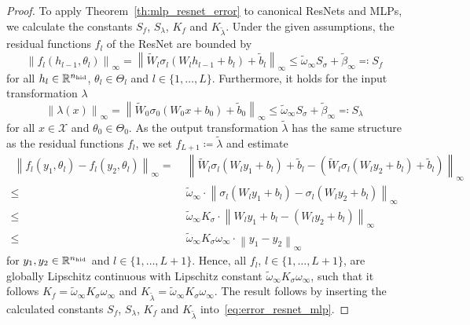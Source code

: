 \documentclass[10pt]{article}
\theoremstyle{definition}
\numberwithin{equation}{section}
\newcommand\norm[1]{\left\lVert#1\right\rVert}
\newcommand{\R}{\mathbb{R}}
\newcommand*{\nhid}{n_\textup{hid}}
\begin{document}
    \begin{proof}
    To apply Theorem~\ref{th:mlp_resnet_error} to canonical ResNets and MLPs, we calculate the constants $S_f$,  $S_\lambda$, $K_f$ and $K_{\tilde{\lambda}}$. Under the given assumptions, the residual functions $f_l$ of the ResNet are bounded by 
	\begin{equation*} \label{eq:resnet_mlp_proof_1}
		\norm{f_l(h_{l-1},\theta_l)}_\infty  = \norm{\widetilde{W}_l \sigma_l(W_l h_{l-1} + b_l) + \tilde{b}_l}_\infty \leq  \widetilde{\omega}_\infty S_\sigma + \tilde{\beta}_\infty \eqqcolon S_f 
	\end{equation*}
	for all $h_l \in \R^{\nhid}$, $\theta_l \in \Theta_l$ and $l \in \{1,\ldots,L\}$. Furthermore, it holds for the input transformation $\lambda$ \begin{equation*}\label{eq:resnet_mlp_proof_2}
		\norm{\lambda(x)}_\infty  = \norm{\widetilde{W}_0 \sigma_0(W_0 x + b_0) + \tilde{b}_0}_\infty \leq \widetilde{\omega}_\infty S_\sigma + \tilde{\beta}_\infty \eqqcolon S_\lambda  
	\end{equation*}
	for all $x \in \mathcal{X}$ and $\theta_0 \in \Theta_0$. As the output transformation $\tilde{\lambda}$ has the same structure as the residual functions $f_l$, we set $f_{L+1} \coloneqq \tilde{\lambda}$ and estimate 
	\begin{align*}
		\; \norm{f_l(y_1,\theta_l) - f_l(y_2,\theta_l)}_\infty = & \; \norm{\widetilde{W}_{l} \sigma_{l}(W_{l} y_1 +b_{l}) + \tilde{b}_{l} - (\widetilde{W}_{l} \sigma_{l}(W_{l} y_2 +b_{l}) + \tilde{b}_{l})}_\infty \\
		\leq & \; \widetilde{\omega}_\infty \cdot \norm{\sigma_{l}(W_{l} y_1 +b_{l}) -\sigma_{l}(W_{l} y_2 +b_{l}) }_\infty \\
		\leq & \; \widetilde{\omega }_\infty  K_{\sigma} \cdot\norm{W_{l}y_1+b_{l}-(W_{l}y_2+b_{l})}_\infty \\
		\leq & \; \widetilde{\omega }_\infty  K_{\sigma}  \omega_\infty \cdot \norm{y_1-y_2}_\infty
	\end{align*}
    for $y_1,y_2\in \R^{\nhid}$ and $l \in \{1,\ldots,L+1\}$. Hence, all $f_l$, $l \in \{1,\ldots,L+1\}$, are globally Lipschitz continuous with Lipschitz constant $\widetilde{\omega }_\infty  K_{\sigma} \omega_\infty$, such that it follows $K_f = \widetilde{\omega }_\infty  K_{\sigma} \omega_\infty$ and $K_{\tilde{\lambda}} = \widetilde{\omega }_\infty  K_{\sigma} \omega_\infty $. The result follows by inserting the calculated constants  $S_f$,  $S_\lambda$, $K_f$ and $K_{\tilde{\lambda}}$ into~\eqref{eq:error_resnet_mlp}.
\end{proof}
\end{document}
